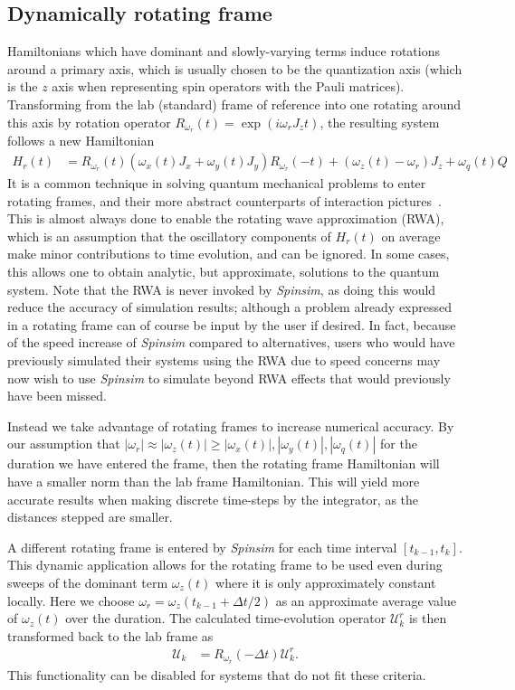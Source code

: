 \documentclass{jors}
\begin{document}
	\subsection{Dynamically rotating frame}\label{sec:rotating_frame}
		Hamiltonians which have dominant and slowly-varying terms induce rotations around a primary axis, which is usually chosen to be the quantization axis (which is the $ z $ axis when representing spin operators with the Pauli matrices).
		Transforming from the lab (standard) frame of reference into one rotating around this axis by rotation operator $ R_{\omega_r}(t) = \exp(i\omega_r J_z t) $, the resulting system follows a new Hamiltonian
		\begin{align}
			H_r(t) &= R_{\omega_r}(t) (\omega_x(t) J_x + \omega_y(t) J_y) R_{\omega_r}(-t) + (\omega_z(t) - \omega_r)J_z +\omega_q(t) Q
		\end{align}
		It is a common technique in solving quantum mechanical problems to enter rotating frames, and their more abstract counterparts of interaction pictures~\cite[(p336,338)]{j_j_sakurai_jun_john_modern_2011}.
		This is almost always done to enable the rotating wave approximation (RWA), which is an assumption that the oscillatory components of $ H_r(t) $ on average make minor contributions to time evolution, and can be ignored.
		In some cases, this allows one to obtain analytic, but approximate, solutions to the quantum system.
		Note that the RWA is never invoked by \emph{Spinsim}, as doing this would reduce the accuracy of simulation results; although a problem already expressed in a rotating frame can of course be input by the user if desired.
		In fact, because of the speed increase of \emph{Spinsim} compared to alternatives, users who would have previously simulated their systems using the RWA due to speed concerns may now wish to use \emph{Spinsim} to simulate beyond RWA effects that would previously have been missed.

		Instead we take advantage of rotating frames to increase numerical accuracy.
		By our assumption that $ |\omega_r| \approx |\omega_z(t)| \ge |\omega_x(t)|, |\omega_y(t)|, |\omega_q(t)| $ for the duration we have entered the frame, then the rotating frame Hamiltonian will have a smaller norm than the lab frame Hamiltonian.
		This will yield more accurate results when making discrete time-steps by the integrator, as the distances stepped are smaller.

		A different rotating frame is entered by \emph{Spinsim} for each time interval $ [t_{k - 1}, t_k] $.
		This dynamic application allows for the rotating frame to be used even during sweeps of the dominant term $ \omega_z(t) $ where it is only approximately constant locally.
		Here we choose $ \omega_r = \omega_z(t_{k - 1} + \Delta t/2) $ as an approximate average value of $ \omega_z(t) $ over the duration.
		The calculated time-evolution operator $ \mathcal{U}_k^r $ is then transformed back to the lab frame as
		\begin{align}
			\mathcal{U}_k &= R_{\omega_r}(-\Delta t)\mathcal{U}_k^r.\label{eq:exit_rotating_frame}
		\end{align}
		This functionality can be disabled for systems that do not fit these criteria.
\end{document}
